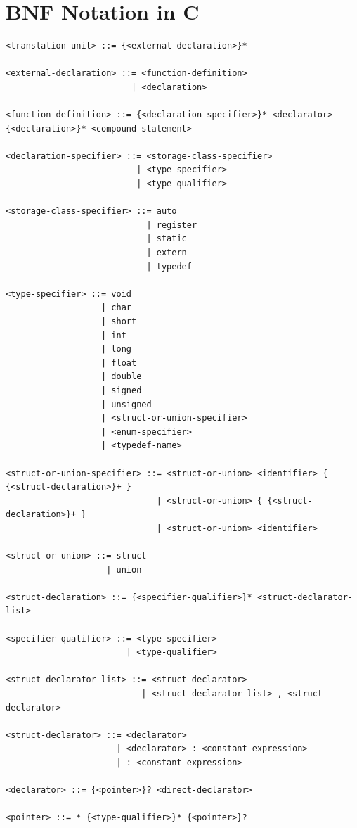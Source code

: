 \documentclass[
	12pt, %
]{fphw}
\begin{document}
\section*{{\color{ForestGreen}BNF Notation in C}}
\begin{verbatim}
<translation-unit> ::= {<external-declaration>}*

<external-declaration> ::= <function-definition>
                         | <declaration>

<function-definition> ::= {<declaration-specifier>}* <declarator> {<declaration>}* <compound-statement>

<declaration-specifier> ::= <storage-class-specifier>
                          | <type-specifier>
                          | <type-qualifier>

<storage-class-specifier> ::= auto
                            | register
                            | static
                            | extern
                            | typedef

<type-specifier> ::= void
                   | char
                   | short
                   | int
                   | long
                   | float
                   | double
                   | signed
                   | unsigned
                   | <struct-or-union-specifier>
                   | <enum-specifier>
                   | <typedef-name>

<struct-or-union-specifier> ::= <struct-or-union> <identifier> { {<struct-declaration>}+ }
                              | <struct-or-union> { {<struct-declaration>}+ }
                              | <struct-or-union> <identifier>

<struct-or-union> ::= struct
                    | union

<struct-declaration> ::= {<specifier-qualifier>}* <struct-declarator-list>

<specifier-qualifier> ::= <type-specifier>
                        | <type-qualifier>

<struct-declarator-list> ::= <struct-declarator>
                           | <struct-declarator-list> , <struct-declarator>

<struct-declarator> ::= <declarator>
                      | <declarator> : <constant-expression>
                      | : <constant-expression>

<declarator> ::= {<pointer>}? <direct-declarator>

<pointer> ::= * {<type-qualifier>}* {<pointer>}?


\end{verbatim}
\end{document}
